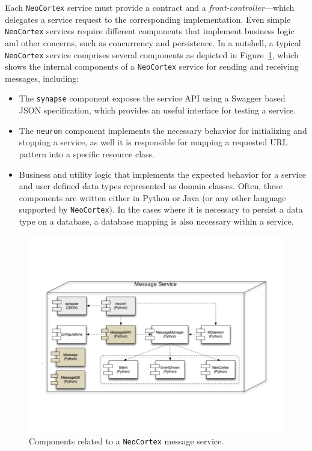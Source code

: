 \documentclass{ws-ijseke}
\newcommand{\neocortex}{\texttt{NeoCortex}}
\begin{document}
Each \neocortex{} service must provide a contract 
and a \emph{front-controller}---which delegates a service request to the 
corresponding implementation.  
Even simple \neocortex{} services require
different components that implement business logic and other
concerns, such as concurrency and
persistence. In a nutshell, a 
typical \neocortex{} service comprises several
components as depicted in Figure~\ref{fig:message}, which shows 
the internal components of a \neocortex{} service for sending and 
receiving messages, including: 

\begin{itemize}
\item The \texttt{synapse}
component exposes the service API using a Swagger based JSON
specification, which provides an useful interface for testing a service.  

\item The \texttt{neuron} component implements the necessary behavior for initializing and
  stopping a service, as well it is responsible for mapping a requested URL pattern into
  a specific resource class. 

\item Business and utility logic that implements the expected behavior for a service 
  and user defined data types represented as domain classes. Often, 
  these components are written either in Python or Java (or any other language supported by \neocortex). 
  In the cases where it is necessary to persist a data type on a database, a database mapping is also
  necessary within a service.  
\end{itemize}





\begin{figure}[hbt]
\begin{center}
\vspace{-.5cm}
\includegraphics[scale=0.4,trim=0cm 5cm 0cm 4.5cm]{message.pdf}
\vspace{-.3cm}
\end{center}
\caption{Components related to a \neocortex{} message service.}
\label{fig:message}
\end{figure}
\end{document}
